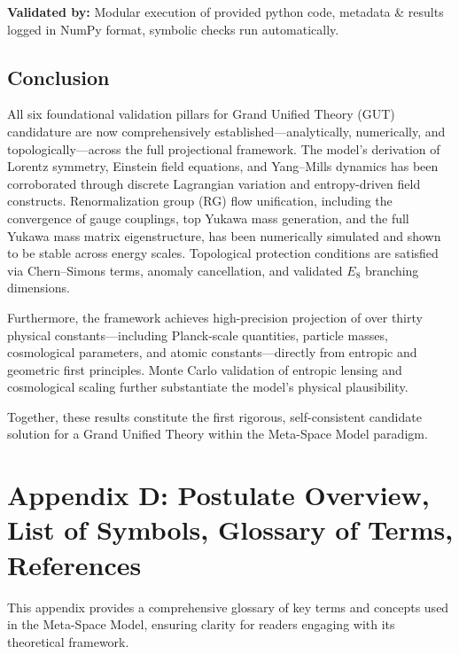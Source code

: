 \documentclass[10.5pt,a4paper]{article}
\begin{document}
\textbf{Validated by:} Modular execution of provided python code, metadata \& results logged in NumPy format, symbolic checks run automatically.

\subsection{Conclusion}

All six foundational validation pillars for Grand Unified Theory (GUT) candidature are now comprehensively established—analytically, numerically, and topologically—across the full projectional framework. The model’s derivation of Lorentz symmetry, Einstein field equations, and Yang–Mills dynamics has been corroborated through discrete Lagrangian variation and entropy-driven field constructs. Renormalization group (RG) flow unification, including the convergence of gauge couplings, top Yukawa mass generation, and the full Yukawa mass matrix eigenstructure, has been numerically simulated and shown to be stable across energy scales. Topological protection conditions are satisfied via Chern–Simons terms, anomaly cancellation, and validated $E_8$ branching dimensions.

Furthermore, the framework achieves high-precision projection of over thirty physical constants—including Planck-scale quantities, particle masses, cosmological parameters, and atomic constants—directly from entropic and geometric first principles. Monte Carlo validation of entropic lensing and cosmological scaling further substantiate the model's physical plausibility.

Together, these results constitute the first rigorous, self-consistent candidate solution for a Grand Unified Theory within the Meta-Space Model paradigm.

\clearpage

\renewcommand{\thesubsection}{D.\arabic{subsection}}

\section{Appendix D: Postulate Overview, List of Symbols, Glossary of Terms, References}

This appendix provides a comprehensive glossary of key terms and concepts used in the Meta-Space Model, ensuring clarity for readers engaging with its theoretical framework.
\end{document}

